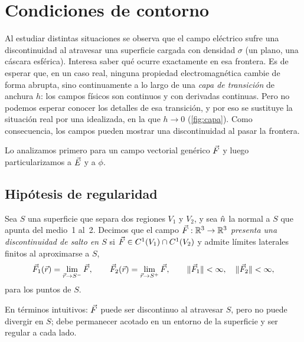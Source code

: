 \section{Condiciones de contorno}\label{sec:contorno}
Al estudiar distintas situaciones se observa que el campo eléctrico sufre una discontinuidad al atravesar una superficie cargada con densidad $\sigma$
(un plano, una cáscara esférica). Interesa saber qué ocurre exactamente en esa frontera. Es de esperar que, en un caso real, ninguna propiedad
electromagnética cambie de forma abrupta, sino continuamente a lo largo de una \emph{capa de transición} de anchura $h$: los campos físicos son continuos y con
derivadas continuas. Pero no podemos esperar conocer los detalles de esa transición, y por eso se sustituye la situación real por una idealizada, en la que
$h\to0$ (\cref{fig:capa}). Como consecuencia, los campos pueden mostrar una discontinuidad al pasar la frontera.



Lo analizamos primero para un campo vectorial genérico $\vec{F}$ y luego particularizamos a $\vec{E}$ y a $\phi$.

\subsection{Hipótesis de regularidad}\label{sec:hipotesis}
\begin{definicion}\label{def:salto}
Sea $S$ una superficie que separa dos regiones $V_1$ y $V_2$, y sea $\hat{n}$ la normal a $S$ que apunta del medio~1 al~2. Decimos que el campo
$\vec{F}:\mathbb{R}^{3}\to\mathbb{R}^{3}$ \emph{presenta una discontinuidad de salto en $S$} si $\vec{F}\in C^{1}(V_1)\cap C^{1}(V_2)$ y admite límites laterales finitos al
aproximarse a $S$,
\[
  \vec{F}_1(\vec{r})=\lim_{\vec{r}\to S^{-}}\vec{F},\qquad\vec{F}_2(\vec{r})=\lim_{\vec{r}\to S^{+}}\vec{F},\qquad
  \lVert \vec{F}_1\rVert<\infty,\quad\lVert \vec{F}_2\rVert<\infty ,
\]
para los puntos de $S$.
\end{definicion}
En términos intuitivos: $\vec{F}$ puede ser discontinuo al atravesar $S$, pero no puede divergir en $S$; debe permanecer acotado en un entorno de la superficie
y ser regular a cada lado.

